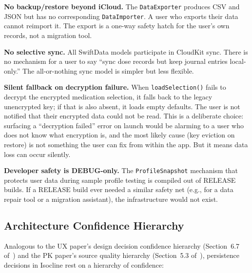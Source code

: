 \documentclass[11pt,a4paper]{article}
\newcommand{\code}[1]{\texttt{\small #1}}
\begin{document}
\textbf{No backup/restore beyond iCloud.} The \code{DataExporter} produces
CSV and JSON but has no corresponding \code{DataImporter}. A user who
exports their data cannot reimport it. The export is a one-way safety hatch
for the user's own records, not a migration tool.

\textbf{No selective sync.} All SwiftData models participate in CloudKit
sync. There is no mechanism for a user to say ``sync dose records but keep
journal entries local-only.'' The all-or-nothing sync model is simpler but
less flexible.

\textbf{Silent fallback on decryption failure.} When
\code{loadSelection()} fails to decrypt the encrypted medication selection,
it falls back to the legacy unencrypted key; if that is also absent, it
loads empty defaults. The user is not notified that their encrypted data
could not be read. This is a deliberate choice: surfacing a ``decryption
failed'' error on launch would be alarming to a user who does not know what
encryption is, and the most likely cause (key eviction on restore) is not
something the user can fix from within the app. But it means data loss can
occur silently.

\textbf{Developer safety is DEBUG-only.} The \code{ProfileSnapshot}
mechanism that protects user data during sample profile testing is compiled
out of RELEASE builds. If a RELEASE build ever needed a similar safety net
(e.g., for a data repair tool or a migration assistant), the infrastructure
would not exist.

\subsection{Architecture Confidence Hierarchy}
\label{sec:confidence}

Analogous to the UX paper's design decision confidence hierarchy
(Section~6.7 of~\cite{xtux}) and the PK paper's source quality hierarchy
(Section~5.3 of~\cite{xtpk}), persistence decisions in Isocline rest on a
hierarchy of confidence:
\end{document}
